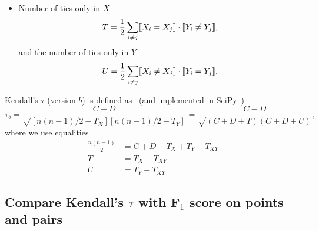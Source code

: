 \begin{itemize}
\item Number of ties only in $X$
      \begin{equation*}
      T = \frac{1}{2} \sum_{i \ne j} \llbracket X_i = X_j \rrbracket \cdot \llbracket Y_i \ne Y_j \rrbracket,
      \end{equation*}
      and the number of ties only in $Y$
      \begin{equation*}
      U = \frac{1}{2} \sum_{i \ne j} \llbracket X_i \ne X_j \rrbracket \cdot \llbracket Y_i = Y_j \rrbracket.
      \end{equation*}
\end{itemize}

Kendall's $\tau$ (version $b$) is defined as~\cite{kendall1945,agresti2010analysis} (and implemented in SciPy~\cite{scipy})
\begin{equation*}
\tau_b = \frac{C - D}{\sqrt{[n(n-1)/2 - T_X] [n(n-1)/2 - T_Y]}} = \frac{C - D}{\sqrt{(C + D + T) (C + D + U)}},
\end{equation*}
where we use equalities 
\begin{align*}
\frac{n(n-1)}{2} &= C + D + T_X + T_Y - T_{XY} \\
T &= T_X - T_{XY} \\
U &= T_Y - T_{XY}
\end{align*}



\subsection{Compare Kendall's $\tau$ with F$_1$ score on points and pairs}
\label{sec:metriccomparison}

